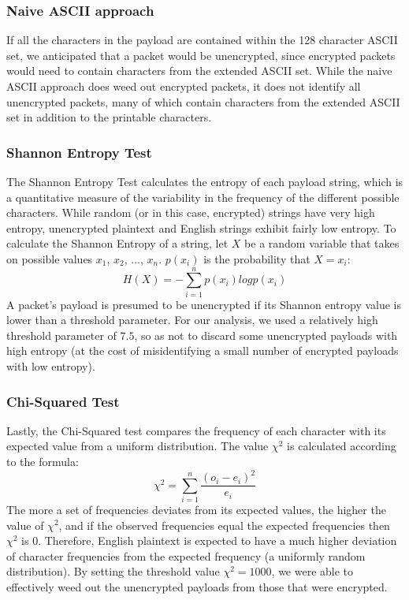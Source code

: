 \subsubsection{Naive ASCII approach}
If all the characters in the payload are contained within the 128 character ASCII set, we anticipated that a packet would be unencrypted, since encrypted packets would need to contain characters from the extended ASCII set. While the naive ASCII approach does weed out encrypted packets, it does not identify all unencrypted packets, many of which contain characters from the extended ASCII set in addition to the printable characters. 

\subsubsection{Shannon Entropy Test}
The Shannon Entropy Test calculates the entropy of each payload string, which is a quantitative measure of the variability in the frequency of the different possible characters. While random (or in this case, encrypted) strings have very high entropy, unencrypted plaintext and English strings exhibit fairly low entropy. To calculate the Shannon Entropy of a string, let $X$ be a random variable that takes on possible values $x_1$, $x_2$, ..., $x_n$. $p(x_i)$ is the probability that $X = x_i$:
$$H(X) = - \sum_{i = 1}^{n} p(x_i) log p(x_i)$$
A packet's payload is presumed to be unencrypted if its Shannon entropy value is lower than a threshold parameter. For our analysis, we used a relatively high threshold parameter of $7.5$, so as not to discard some unencrypted payloads with high entropy (at the cost of misidentifying a small number of encrypted payloads with low entropy).

\subsubsection{Chi-Squared Test}
Lastly, the Chi-Squared test compares the frequency of each character with its expected value from a uniform distribution. The value $\chi^2$ is calculated according to the formula:
$$\chi^2 = \sum_{i=1}^{n} \frac{(o_i-e_i)^2}{e_i}$$
The more a set of frequencies deviates from its expected values, the higher the value of $\chi^2$, and if the observed frequencies equal the expected frequencies then $\chi^2$ is 0. Therefore, English plaintext is expected to have a much higher deviation of character frequencies from the expected frequency (a uniformly random distribution). By setting the threshold value $\chi^2 = 1000$, we were able to effectively weed out the unencrypted payloads from those that were encrypted. 


